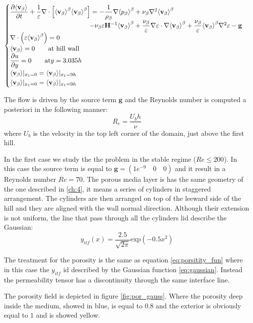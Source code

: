 \begin{eqnarray}
\begin{cases}
\dfrac{\partial {\left< \textbf{v}_{\beta} \right>}}{\partial t} + \dfrac{1}{\varepsilon} \nabla \cdot \left[  {\left< \textbf{v}_{\beta} \right>}^{\beta}  {\left< \textbf{v}_{\beta} \right>}^{\beta} \right] = -\dfrac{1}{\rho_{\beta}} \nabla {\left< p_{\beta}\right>}^{\beta} + \nu_{\beta} \nabla^2 {\left< \textbf{v}_{\beta} \right>}^{\beta} \\ 
\qquad \qquad \qquad \qquad \qquad \qquad- \nu_{\beta} \varepsilon \mathbf{H}^{-1} {\left< \textbf{v}_{\beta} \right>}^{\beta} +\dfrac{\nu_{\beta}}{\varepsilon} \nabla \varepsilon \cdot \nabla {\left< \textbf{v}_{\beta} \right>}^{\beta} + \dfrac{\nu_{\beta}}{\varepsilon} {\left< \textbf{v}_{\beta} \right>}^{\beta} \nabla^2 \varepsilon - \mathbf{g}\\
\nabla \cdot \left(\varepsilon {\left< \textbf{v}_{\beta} \right>}^{\beta} \right) = 0\\
{\left< \textbf{v}_{\beta} \right>} = 0 \qquad \textrm{at hill wall} \\
\dfrac{\partial u}{\partial y}=0 \qquad \textrm{at} y = 3.035h\\
{\left< \textbf{v}_{\beta} \right>}|_{x_1 = 0} = {\left< \textbf{v}_{\beta} \right>}|_{x_1 = 9h} \\
{\left< \textbf{v}_{\beta} \right>}|_{x_1 = 0} = {\left< \textbf{v}_{\beta} \right>}|_{x_1 = 9h} 
\end{cases}
\end{eqnarray}

The flow is driven by the source term $\mathbf{g}$ and the Reynolds number is computed a posteriori in the following manner:
$$
R_e = \dfrac{U_b h}{\nu}
$$
where $U_b$ is the velocity in the top left corner of the domain, just above the first hill.

In the first case we study the the problem in the stable regime ($Re\leq200$). In this case the source term is equal to $\mathbf{g} = (1e^{-9} \quad0 \quad0)$ and it result in a Reynolds number $Re=70$.
The porous media layer is has the same geometry of the one described in \ref{ch:4}, it means a series of cylinders in staggered arrangement. The cylinders are then arranged on top of the leeward side of the hill and they are aligned with the wall normal direction. Although their extension is not uniform, the line that pass through all the cylinders lid describe the Gaussian:
\begin{equation}
	y_{itf}(x) = \dfrac{2.5}{\sqrt{2\pi}} \textrm{exp}\left( -0.5 x^2 \right)
	\label{eq:gaussian}
\end{equation}

The treatment for the porosity is the same as equation \eqref{eq:porsitity_fun} where in this case the $y_{itf}$ id described by the Gaussian function \eqref{eq:gaussian}.
Instead the permeability tensor has a discontinuity through the same interface line.

The porosity field is depicted in figure \ref{fig:por_gauss}. Where the porosity deep inside the medium, showed in blue, is equal to $0.8$ and the exterior is obviously equal to $1$ and is showed yellow.

